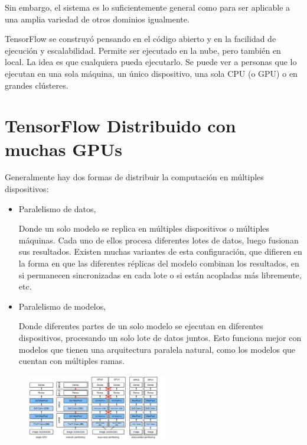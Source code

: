 \documentclass[10pt, fleqn, journal]{IEEEtran}
\theoremstyle{break}                                            %
\begin{document}
    Sin embargo, el sistema es lo suficientemente general como para ser aplicable a una amplia variedad 
    de otros dominios igualmente.

    TensorFlow se construyó pensando en el código abierto y en la facilidad de ejecución y escalabilidad. 
    Permite ser ejecutado en la nube, pero también en local. La idea es que cualquiera pueda ejecutarlo. 
    Se puede ver a personas que lo ejecutan en una sola máquina, un único dispositivo, una sola CPU (o GPU) 
    o en grandes clústeres. 

  \section{TensorFlow Distribuido con muchas GPUs}

    Generalmente hay dos formas de distribuir la computación en múltiples dispositivos:
    \begin{itemize}
      \item Paralelismo de datos, 
      
        Donde un solo modelo se replica en múltiples dispositivos o múltiples máquinas.
        Cada uno de ellos procesa diferentes lotes de datos, luego fusionan sus resultados. 
        Existen muchas variantes de esta configuración, que difieren en la forma en que las diferentes 
        réplicas del modelo combinan los resultados, en si permanecen sincronizadas en cada lote o si 
        están acopladas más libremente, etc.

      \item Paralelismo de modelos, 
      
        Donde diferentes partes de un solo modelo se ejecutan en diferentes dispositivos,
        procesando un solo lote de datos juntos. Esto funciona mejor con modelos que tienen
         una arquitectura paralela natural, como los modelos que cuentan con múltiples ramas.
    \end{itemize}

    \begin{figure}[h!]
      \includegraphics[width=0.55\textwidth]{modeltypes}
    \end{figure}
\end{document}
